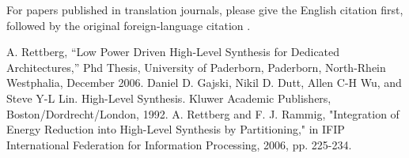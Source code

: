 \documentclass[conference]{IEEEtran}
\begin{document}
For papers published in translation journals, please give the English 
citation first, followed by the original foreign-language citation \cite{b6}.

\begin{thebibliography}{00}
 A. Rettberg, ``Low Power Driven High-Level Synthesis
for Dedicated Architectures,'' Phd Thesis, University of Paderborn, Paderborn, North-Rhein Westphalia, December 2006.
 Daniel D. Gajski, Nikil D. Dutt, Allen C-H Wu, and Steve Y-L Lin. High-Level Synthesis. Kluwer Academic Publishers, Boston/Dordrecht/London, 1992.
 A. Rettberg and F. J. Rammig, "Integration of Energy Reduction into High-Level Synthesis by Partitioning," in IFIP International Federation for Information Processing, 2006, pp. 225-234. 
\end{thebibliography}
\vspace{12pt}
\color{red}
\end{document}
